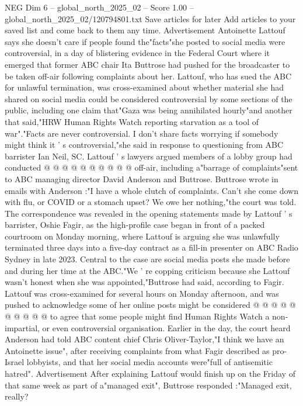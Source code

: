 \begin{textsample}{NEG Dim 6 – global\_north\_2025\_02 – Score 1.00 – global\_north\_2025\_02/120794801.txt}  \label{ex:f6_neg_085}
Save articles for later Add articles to your saved list and come back to them any time.
Advertisement Antoinette Lattouf says she doesn't care if people found the"facts"she posted to social media were controversial, in a day of blistering evidence in the Federal Court where it emerged that former ABC chair Ita Buttrose had pushed for the broadcaster to be taken off-air following complaints about her.
Lattouf, who has sued the ABC for unlawful termination, was cross-examined about whether material she had shared on social media could be considered controversial by some sections of the public, including one claim that"Gaza was being annihilated hourly"and another that said,"HRW Human Rights Watch reporting starvation as a tool of war"."Facts are never controversial.
I don't share facts worrying if somebody might think it ' s controversial,"she said in response to questioning from ABC barrister Ian Neil, SC.
Lattouf ' s lawyers argued members of a lobby group had conducted @ @ @ @ @ @ @ @ @ @ off-air, including a"barrage of complaints"sent to ABC managing director David Anderson and Buttrose.
Buttrose wrote in emails with Anderson :"I have a whole clutch of complaints.
Can't she come down with flu, or COVID or a stomach upset?
We owe her nothing,"the court was told.
The correspondence was revealed in the opening statements made by Lattouf ' s barrister, Oshie Fagir, as the high-profile case began in front of a packed courtroom on Monday morning, where Lattouf is arguing she was unlawfully terminated three days into a five-day contract as a fill-in presenter on ABC Radio Sydney in late 2023.
Central to the case are social media posts she made before and during her time at the ABC."We ' re copping criticism because she Lattouf wasn't honest when she was appointed,"Buttrose had said, according to Fagir.
Lattouf was cross-examined for several hours on Monday afternoon, and was pushed to acknowledge some of her online posts might be considered @ @ @ @ @ @ @ @ @ @ to agree that some people might find Human Rights Watch a non-impartial, or even controversial organisation.
Earlier in the day, the court heard Anderson had told ABC content chief Chris Oliver-Taylor,"I think we have an Antoinette issue", after receiving complaints from what Fagir described as pro-Israel lobbyists, and that her social media accounts were"full of antisemitic hatred".
Advertisement After explaining Lattouf would finish up on the Friday of that same week as part of a"managed exit", Buttrose responded :"Managed exit, really?

\end{textsample}
